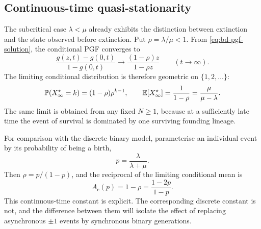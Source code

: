 \subsection{Continuous-time quasi-stationarity}
\label{sec:cts}

The subcritical case \(\lambda<\mu\) already exhibits the distinction between
extinction and the state observed before extinction.  Put
\(\rho=\lambda/\mu<1\).  From \eqref{eq:bd-pgf-solution}, the conditional PGF
converges to
\begin{equation}
  \frac{g(z,t)-g(0,t)}{1-g(0,t)}
  \longrightarrow
  \frac{(1-\rho)z}{1-\rho z}
  \qquad (t\to\infty).
  \label{eq:ct-yaglom-pgf}
\end{equation}
The limiting conditional distribution is therefore geometric on
\(\{1,2,\ldots\}\):
\begin{equation}
  \mathbb{P}(X_\infty^{\star}=k)=(1-\rho)\rho^{k-1},
  \qquad
  \mathbb{E}[X_\infty^{\star}]=\frac{1}{1-\rho}
  =\frac{\mu}{\mu-\lambda}.
  \label{eq:ctsqsmean}
\end{equation}
The same limit is obtained from any fixed \(N\geq1\), because at a sufficiently
late time the event of survival is dominated by one surviving founding lineage.

For comparison with the discrete binary model, parameterise an individual event
by its probability of being a birth,
\begin{equation}
  p=\frac{\lambda}{\lambda+\mu}.
  \label{eq:rate-to-p}
\end{equation}
Then \(\rho=p/(1-p)\), and the reciprocal of the limiting conditional mean is
\begin{equation}
  A_{\mathrm c}(p)=1-\rho=\frac{1-2p}{1-p}.
  \label{eq:Acts}
\end{equation}
This continuous-time constant is explicit.  The corresponding discrete constant
is not, and the difference between them will isolate the effect of replacing
asynchronous \(\pm1\) events by synchronous binary generations.

\FloatBarrier

